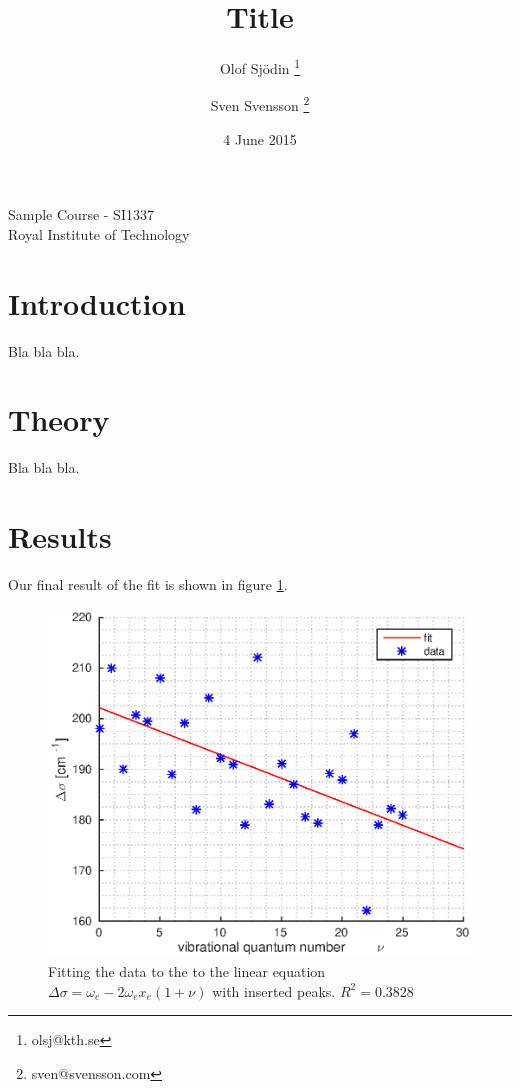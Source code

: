 \documentclass{article}
\begin{document}
\title{Title}
\author{Olof Sjödin \thanks{olsj@kth.se} \and Sven Svensson
\thanks{sven@svensson.com}}
\date{4 June 2015}
\maketitle

\vspace*{18\baselineskip}
\begin{center}
    Sample Course - SI1337\\
    Royal Institute of Technology
\end{center}
\thispagestyle{empty}
\newpage

\section{Introduction}
Bla bla bla.

\section{Theory}
Bla bla bla.

\section{Results}


Our final result of the fit is shown in figure \ref{fig:curvefit}.

\begin{figure}[H]
\centering
\includegraphics{fit-including-missing-peaks.eps}
\caption{Fitting the data to the to the linear equation $\Delta \sigma = \omega_e-2\omega_ex_e(1+\nu)$ with inserted peaks. $R^2=0.3828$}
\label{fig:curvefit}
\end{figure}
\end{document}
